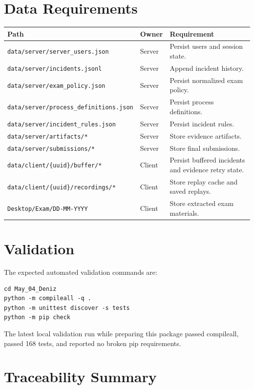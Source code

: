\documentclass[12pt,a4paper]{article}
\begin{document}
\section{Data Requirements}

\begin{longtable}{L{0.38\textwidth} L{0.18\textwidth} L{0.34\textwidth}}
\textbf{Path} & \textbf{Owner} & \textbf{Requirement} \\
\hline
\texttt{data/server/server\_users.json} & Server & Persist users and session state. \\
\texttt{data/server/incidents.jsonl} & Server & Append incident history. \\
\texttt{data/server/exam\_policy.json} & Server & Persist normalized exam policy. \\
\texttt{data/server/process\_definitions.json} & Server & Persist process definitions. \\
\texttt{data/server/incident\_rules.json} & Server & Persist incident rules. \\
\texttt{data/server/artifacts/*} & Server & Store evidence artifacts. \\
\texttt{data/server/submissions/*} & Server & Store final submissions. \\
\texttt{data/client/\{uuid\}/buffer/*} & Client & Persist buffered incidents and evidence retry state. \\
\texttt{data/client/\{uuid\}/recordings/*} & Client & Store replay cache and saved replays. \\
\texttt{Desktop/Exam/DD-MM-YYYY} & Client & Store extracted exam materials. \\
\end{longtable}

\section{Validation}

The expected automated validation commands are:

\begin{verbatim}
cd May_04_Deniz
python -m compileall -q .
python -m unittest discover -s tests
python -m pip check
\end{verbatim}

The latest local validation run while preparing this package passed compileall,
passed 168 tests, and reported no broken pip requirements.

\section{Traceability Summary}
\end{document}
